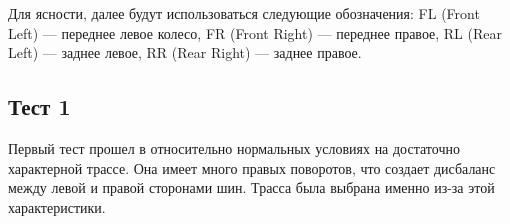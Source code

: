 \documentclass[a4paper,12pt]{report}
\newlength{\twosubht}
\begin{document}
        Для ясности, далее будут использоваться следующие обозначения: FL (Front Left) --- переднее левое колесо, FR (Front Right) --- переднее правое, RL (Rear Left) --- заднее левое, RR (Rear Right) --- заднее правое.

    \subsection{Тест 1}
        Первый тест прошел в относительно нормальных условиях на достаточно характерной трассе. Она имеет много правых поворотов, что создает дисбаланс между левой и правой сторонами шин. Трасса была выбрана именно из-за этой характеристики. 
        
        \begin{figure}[htp]

            \sbox{}
            \setlength{\twosubht}{\ht\twosubbox}
            
            
            \centering
            
            \quad
            
            
        \end{figure}
        
\end{document}
